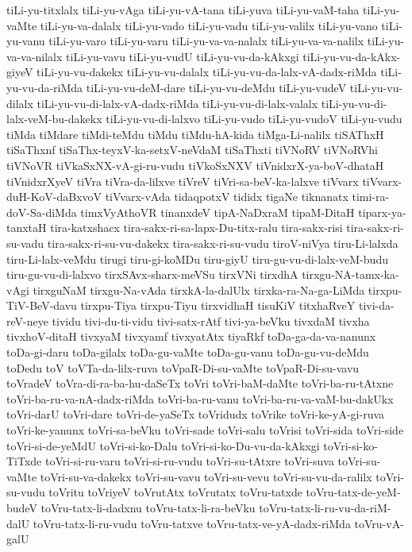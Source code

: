 {tiLi-yu-titxlalx
tiLi-yu-vAga
tiLi-yu-vA-tana
tiLi-yuva
tiLi-yu-vaM-taha
tiLi-yu-vaMte
tiLi-yu-va-dalalx
tiLi-yu-vado
tiLi-yu-vadu
tiLi-yu-valilx
tiLi-yu-vano
tiLi-yu-vanu
tiLi-yu-varo
tiLi-yu-varu
tiLi-yu-va-va-nalalx
tiLi-yu-va-va-nalilx
tiLi-yu-va-va-nilalx
tiLi-yu-vavu
tiLi-yu-vudU
tiLi-yu-vu-da-kAkxgi
tiLi-yu-vu-da-kAkx-giyeV
tiLi-yu-vu-dakekx
tiLi-yu-vu-dalalx
tiLi-yu-vu-da-lalx-vA-dadx-riMda
tiLi-yu-vu-da-riMda
tiLi-yu-vu-deM-dare
tiLi-yu-vu-deMdu
tiLi-yu-vudeV
tiLi-yu-vu-dilalx
tiLi-yu-vu-di-lalx-vA-dadx-riMda
tiLi-yu-vu-di-lalx-valalx
tiLi-yu-vu-di-lalx-veM-bu-dakekx
tiLi-yu-vu-di-lalxvo
tiLi-yu-vudo
tiLi-yu-vudoV
tiLi-yu-vudu
tiMda
tiMdare
tiMdi-teMdu
tiMdu
tiMdu-hA-kida
tiMga-Li-nalilx
tiSAThxH
tiSaThxnf
tiSaThx-teyxV-ka-setxV-neVdaM
tiSaThxti
tiVNoRV
tiVNoRVhi
tiVNoVR
tiVkaSxNX-vA-gi-ru-vudu
tiVkoSxNXV
tiVnidxrX-ya-boV-dhataH
tiVnidxrXyeV
tiVra
tiVra-da-lilxve
tiVreV
tiVri-sa-beV-ka-lalxve
tiVvarx
tiVvarx-duH-KoV-daBxvoV
tiVvarx-vAda
tidaqpotxV
tididx
tigaNe
tiknanatx
timi-ra-doV-Sa-diMda
timxVyAthoVR
tinanxdeV
tipA-NaDxraM
tipaM-DitaH
tiparx-ya-tanxtaH
tira-katxshacx
tira-sakx-ri-sa-lapx-Du-titx-ralu
tira-sakx-risi
tira-sakx-ri-su-vadu
tira-sakx-ri-su-vu-dakekx
tira-sakx-ri-su-vudu
tiroV-niVya
tiru-Li-lalxda
tiru-Li-lalx-veMdu
tirugi
tiru-gi-koMDu
tiru-giyU
tiru-gu-vu-di-lalx-veM-budu
tiru-gu-vu-di-lalxvo
tirxSAvx-sharx-meVSu
tirxVNi
tirxdhA
tirxgu-NA-tamx-ka-vAgi
tirxguNaM
tirxgu-Na-vAda
tirxkA-la-dalUlx
tirxka-ra-Na-ga-LiMda
tirxpu-TiV-BeV-davu
tirxpu-Tiya
tirxpu-Tiyu
tirxvidhaH
tisuKiV
titxhaRveY
tivi-da-reV-neye
tividu
tivi-du-ti-vidu
tivi-satx-rAtf
tivi-ya-beVku
tivxdaM
tivxha
tivxhoV-ditaH
tivxyaM
tivxyamf
tivxyatAtx
tiyaRkf
toDa-ga-da-va-nanunx
toDa-gi-daru
toDa-gilalx
toDa-gu-vaMte
toDa-gu-vanu
toDa-gu-vu-deMdu
toDedu
toV
toVTa-da-lilx-ruva
toVpaR-Di-su-vaMte
toVpaR-Di-su-vavu
toVradeV
toVra-di-ra-ba-hu-daSeTx
toVri
toVri-baM-daMte
toVri-ba-ru-tAtxne
toVri-ba-ru-va-nA-dadx-riMda
toVri-ba-ru-vanu
toVri-ba-ru-va-vaM-bu-dakUkx
toVri-darU
toVri-dare
toVri-de-yaSeTx
toVridudx
toVrike
toVri-ke-yA-gi-ruva
toVri-ke-yanunx
toVri-sa-beVku
toVri-sade
toVri-salu
toVrisi
toVri-sida
toVri-side
toVri-si-de-yeMdU
toVri-si-ko-Dalu
toVri-si-ko-Du-vu-da-kAkxgi
toVri-si-ko-TiTxde
toVri-si-ru-varu
toVri-si-ru-vudu
toVri-su-tAtxre
toVri-suva
toVri-su-vaMte
toVri-su-va-dakekx
toVri-su-vavu
toVri-su-vevu
toVri-su-vu-da-ralilx
toVri-su-vudu
toVritu
toVriyeV
toVrutAtx
toVrutatx
toVru-tatxde
toVru-tatx-de-yeM-budeV
toVru-tatx-li-dadxnu
toVru-tatx-li-ra-beVku
toVru-tatx-li-ru-vu-da-riM-dalU
toVru-tatx-li-ru-vudu
toVru-tatxve
toVru-tatx-ve-yA-dadx-riMda
toVru-vA-galU
}
